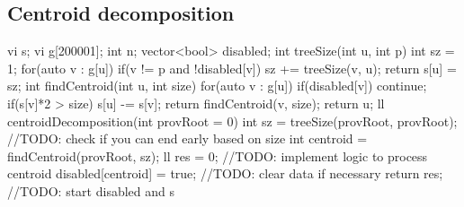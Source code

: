 \documentclass[10pt, landscape, twocolumn, a4paper, notitlepage]{article}
\begin{document}
\subsection{Centroid decomposition}
\begin{code}
vi s;
vi g[200001];
int n;
vector<bool> disabled;
int treeSize(int u, int p) {
    int sz = 1;
    for(auto v : g[u]) {
        if(v != p and !disabled[v]) {
            sz += treeSize(v, u);
        }
    }
    return s[u] = sz;
} 
int findCentroid(int u, int size) {
    for(auto v : g[u]) {
        if(disabled[v]) continue;
        if(s[v]*2 > size) {
            s[u] -= s[v];  
            return findCentroid(v, size);
        }
    }
    return u;
}
ll centroidDecomposition(int provRoot = 0) {
    int sz = treeSize(provRoot, provRoot);
    //TODO: check if you can end early based on size
    int centroid = findCentroid(provRoot, sz);
    ll res = 0;
    //TODO: implement logic to process centroid
    disabled[centroid] = true;
    //TODO: clear data if necessary
    return res;
}
//TODO: start disabled and s
\end{code}
\end{document}
